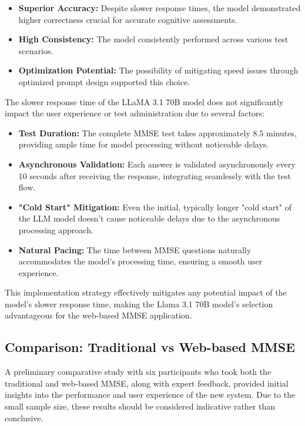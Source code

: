 \begin{itemize}
    \item \textbf{Superior Accuracy:} Despite slower response times, the model demonstrated higher correctness crucial for accurate cognitive assessments.
    
    \item \textbf{High Consistency:} The model consistently performed across various test scenarios.
    
    \item \textbf{Optimization Potential:} The possibility of mitigating speed issues through optimized prompt design supported this choice.
\end{itemize}

The slower response time of the LLaMA 3.1 70B model does not significantly impact the user experience or test administration due to several factors:

\begin{itemize}
    \item \textbf{Test Duration:} The complete MMSE test takes approximately 8.5 minutes, providing ample time for model processing without noticeable delays.
    
    \item \textbf{Asynchronous Validation:} Each answer is validated asynchronously every 10 seconds after receiving the response, integrating seamlessly with the test flow.
    
    \item \textbf{"Cold Start" Mitigation:} Even the initial, typically longer "cold start" of the LLM model doesn't cause noticeable delays due to the asynchronous processing approach.
    
    \item \textbf{Natural Pacing:} The time between MMSE questions naturally accommodates the model's processing time, ensuring a smooth user experience.
\end{itemize}

This implementation strategy effectively mitigates any potential impact of the model's slower response time, making the Llama 3.1 70B model's selection advantageous for the web-based MMSE application.

\subsection{Comparison: Traditional vs Web-based MMSE}

A preliminary comparative study with six participants who took both the traditional and web-based MMSE, along with expert feedback, provided initial insights into the performance and user experience of the new system. Due to the small sample size, these results should be considered indicative rather than conclusive.

